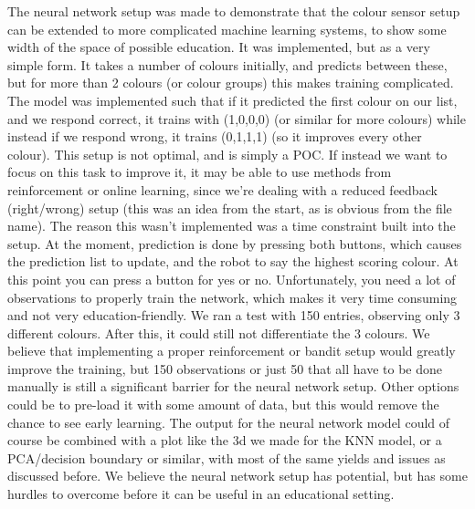 \documentclass[11pt, a4paper]{article}
\begin{document}
The neural network setup was made to demonstrate that the colour sensor setup can be extended to more complicated machine learning systems, to show some width of the space of possible education. It was implemented, but as a very simple form. It takes a number of colours initially, and predicts between these, but for more than 2 colours (or colour groups) this makes training complicated. The model was implemented such that if it predicted the first colour on our list, and we respond correct, it trains with (1,0,0,0) (or similar for more colours) while instead if we respond wrong, it trains (0,1,1,1) (so it improves every other colour). This setup is not optimal, and is simply a POC. If instead we want to focus on this task to improve it, it may be able to use methods from reinforcement or online learning, since we're dealing with a reduced feedback (right/wrong) setup (this was an idea from the start, as is obvious from the file name). The reason this wasn't implemented was a time constraint built into the setup. At the moment, prediction is done by pressing both buttons, which causes the prediction list to update, and the robot to say the highest scoring colour. At this point you can press a button for yes or no. Unfortunately, you need a lot of observations to properly train the network, which makes it very time consuming and not very education-friendly. We ran a test with 150 entries, observing only 3 different colours. After this, it could still not differentiate the 3 colours. We believe that implementing a proper reinforcement or bandit setup would greatly improve the training, but 150 observations or just 50 that all have to be done manually is still a significant barrier for the neural network setup. Other options could be to pre-load it with some amount of data, but this would remove the chance to see early learning. The output for the neural network model could of course be combined with a plot like the 3d we made for the KNN model, or a PCA/decision boundary or similar, with most of the same yields and issues as discussed before. We believe the neural network setup has potential, but has some hurdles to overcome before it can be useful in an educational setting.

\pagebreak
\end{document}
